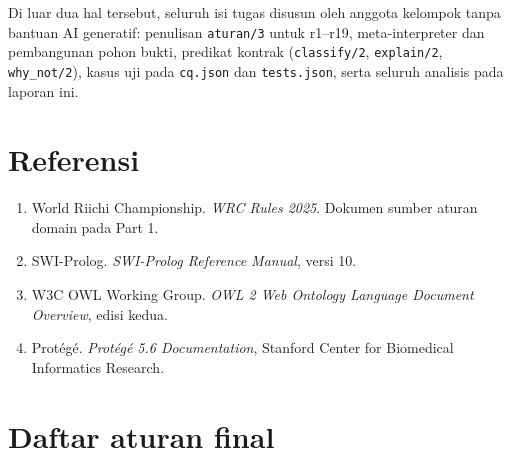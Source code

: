 \documentclass[11pt,a4paper]{article}
\newcommand{\code}[1]{\texttt{#1}}
\begin{document}
Di luar dua hal tersebut, seluruh isi tugas disusun oleh anggota kelompok tanpa bantuan
AI generatif: penulisan \code{aturan/3} untuk r1--r19, meta-interpreter dan pembangunan
pohon bukti, predikat kontrak (\code{classify/2}, \code{explain/2}, \code{why_not/2}),
kasus uji pada \code{cq.json} dan \code{tests.json}, serta seluruh analisis pada laporan
ini.

\section{Referensi}

\begin{enumerate}
\item World Riichi Championship. \textit{WRC Rules 2025}. Dokumen sumber aturan domain
      pada Part 1.
\item SWI-Prolog. \textit{SWI-Prolog Reference Manual}, versi 10.
\item W3C OWL Working Group. \textit{OWL 2 Web Ontology Language Document Overview},
      edisi kedua.
\item Protégé. \textit{Protégé 5.6 Documentation}, Stanford Center for Biomedical
      Informatics Research.
\end{enumerate}

\appendix
\section{Daftar aturan final}
\end{document}
